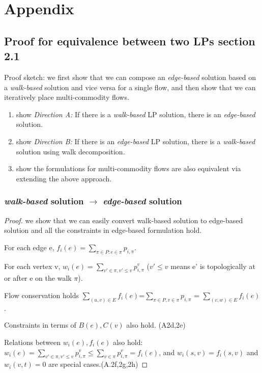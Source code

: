 \appendix
\section{Appendix}
\subsection{Proof for equivalence between two LPs section 2.1} \label{subsec:lppaths}
Proof sketch: we first show that we can compose an \emph{edge-based} solution based on a \emph{walk-based} solution and vice versa for a single flow, and then show that we can iteratively place multi-commodity flows. 
\begin{enumerate}
\item show \emph{Direction A:} If there is a \emph{walk-based} LP solution, there is an \emph{edge-based} solution.
\item show \emph{Direction B:} If there is an \emph{edge-based} LP solution, there is a \emph{walk-based} solution using walk decomposition.
\item show the formulations for multi-commodity flows are also equivalent via extending the above approach.
\end{enumerate}

\subsubsection{\emph{walk-based} solution $\rightarrow$ \emph{edge-based} solution}
\begin{proof}
we show that we can easily convert walk-based solution to edge-based solution and all the constraints in edge-based formulation hold.

For each edge e, $f_i(e) =\sum\limits_{\pi\in P: e\in \pi} p_{i,\pi}$.

For each vertex v, $w_i(e) =  \sum\limits_{v'\in \pi, v' \leq v} p_{i,\pi}^v$ ($v'\leq v$ means e' is topologically at or after e on the walk $\pi$). 

Flow conservation holds $ \sum\limits_{(u,v)\in E} f_i(e) $=$ \sum\limits_{\pi\in P, v\in \pi} p_{i, \pi}$ = $\sum\limits_{(v,w )\in E} f_i(e)$. 

Constraints in terms of $B(e), C(v)$ also hold. (A2d,2e)

Relations between $w_i(e), f_i(e)$ also hold: $w_i(e)=  \sum\limits_{v'\in \pi, v' \leq v} p_{i,\pi}^v \leq \sum \limits_{v\in \pi} p_{i,\pi}^v = f_i(e) $, and $w_i(s,v)=f_i(s,v)$ and $w_i(v,t)=0$ are special cases.(A.2f,2g,2h)

\end{proof}

